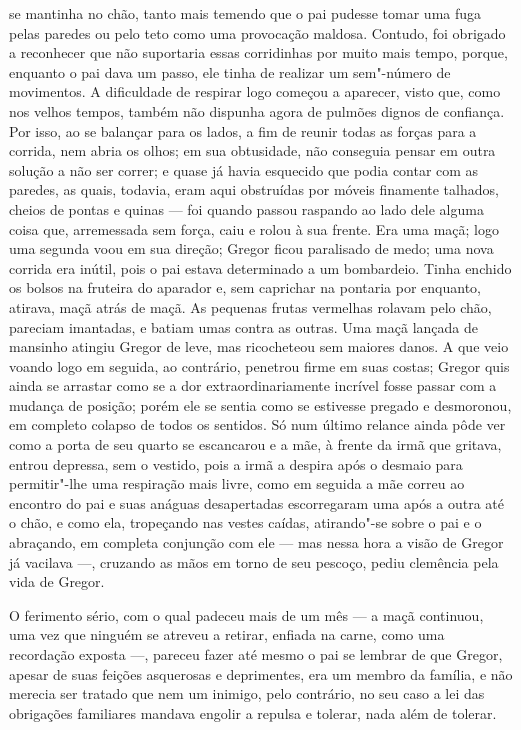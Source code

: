 se mantinha no chão, tanto mais temendo que o pai pudesse tomar uma fuga
pelas paredes ou pelo teto como uma provocação maldosa. Contudo, foi
obrigado a reconhecer que não suportaria essas corridinhas por muito mais
tempo, porque, enquanto o pai dava um passo, ele tinha de realizar um
sem"-número de movimentos. A dificuldade de respirar logo começou a
aparecer, visto que, como nos velhos tempos, também não dispunha agora de
pulmões dignos de confiança. Por isso, ao se balançar para os lados, a fim
de reunir todas as forças para a corrida, nem abria os olhos; em sua
obtusidade, não conseguia pensar em outra solução a não ser correr; e
quase já havia esquecido que podia contar com as paredes, as quais,
todavia, eram aqui obstruídas por móveis finamente talhados, cheios de
pontas e quinas --- foi quando passou raspando ao lado dele alguma coisa
que, arremessada sem força, caiu e rolou à sua frente. Era uma maçã; logo
uma segunda voou em sua direção; Gregor ficou paralisado de medo; uma nova
corrida era inútil, pois o pai estava determinado a um bombardeio. Tinha
enchido os bolsos na fruteira do aparador e, sem caprichar na pontaria por
enquanto, atirava, maçã atrás de maçã. As pequenas frutas vermelhas
rolavam pelo chão, pareciam imantadas, e batiam umas contra as outras. Uma
maçã lançada de mansinho atingiu Gregor de leve, mas ricocheteou sem
maiores danos. A que veio voando logo em seguida, ao contrário, penetrou
firme em suas costas; Gregor quis ainda se arrastar como se a dor
extraordinariamente incrível fosse passar com a mudança de posição; porém
ele se sentia como se estivesse pregado e desmoronou, em completo colapso
de todos os sentidos. Só num último relance ainda pôde ver como a porta de
seu quarto se escancarou e a mãe, à frente da irmã que gritava, entrou
depressa, sem o vestido, pois a irmã a despira após o desmaio para
permitir"-lhe uma respiração mais livre, como em seguida a mãe correu ao
encontro do pai e suas anáguas desapertadas escorregaram uma após a outra
até o chão, e como ela, tropeçando nas vestes caídas, atirando"-se sobre o
pai e o abraçando, em completa conjunção com ele --- mas nessa hora a visão
de Gregor já vacilava ---, cruzando as mãos em torno de seu pescoço, pediu
clemência pela vida de Gregor. 

\sectionitem

O ferimento sério, com o qual padeceu mais de um mês --- a maçã continuou,
uma vez que ninguém se atreveu a retirar, enfiada na carne, como uma
recordação exposta ---, pareceu fazer até mesmo o pai se lembrar de que
Gregor, apesar de suas feições asquerosas e deprimentes, era um membro da
família, e não merecia ser tratado que nem um inimigo, pelo contrário, no
seu caso a lei das obrigações familiares mandava engolir a repulsa e
tolerar, nada além de tolerar.

